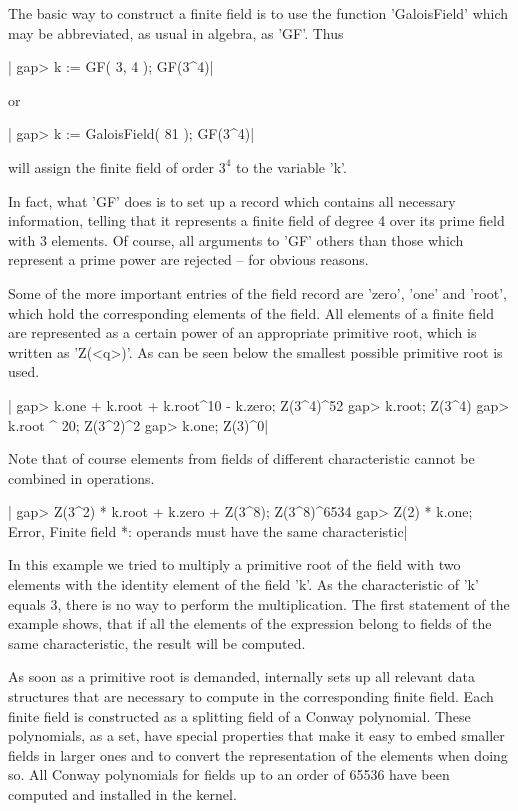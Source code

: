 The basic  way  to  construct  a finite  field  is to  use  the  function
'GaloisField'  which may  be abbreviated, as  usual in algebra,  as 'GF'.
Thus

|    gap> k := GF( 3, 4 );
    GF(3^4)|

or

|    gap> k := GaloisField( 81 );
    GF(3^4)|

will assign the finite field of order $3^4$ to the variable 'k'.

In  fact, what  'GF'  does  is to  set  up a  record  which contains  all
necessary  information,  telling that  it represents  a  finite  field of
degree 4 over its prime field with  3 elements.  Of course, all arguments
to 'GF' others than those which represent a  prime power are rejected  --
for obvious reasons.

Some of the  more important entries of the field record are 'zero', 'one'
and 'root',  which hold the corresponding elements  of  the  field.   All
elements  of  a finite  field  are represented as a certain power  of  an
appropriate primitive root, which is written as 'Z(<q>)'.  As can be seen
below the smallest possible primitive root is used.

|    gap> k.one + k.root + k.root^10 - k.zero;
    Z(3^4)^52
    gap> k.root;
    Z(3^4)
    gap> k.root ^ 20;
    Z(3^2)^2
    gap> k.one;
    Z(3)^0|

Note that  of  course  elements from  fields of  different characteristic
cannot be combined in operations.

|    gap> Z(3^2) * k.root + k.zero + Z(3^8);
    Z(3^8)^6534
    gap> Z(2) * k.one;
    Error, Finite field *: operands must have the same characteristic|

In this example we tried to multiply a primitive  root of the  field with
two  elements  with  the  identity  element  of  the field  'k'.  As  the
characteristic  of  'k'  equals  3,  there  is  no  way  to  perform  the
multiplication.  The  first statement of the example shows,  that  if all
the   elements  of  the  expression   belong   to   fields  of  the  same
characteristic, the result will be computed.

As soon as  a primitive  root is demanded,  {\GAP} internally sets up all
relevant  data  structures   that  are  necessary  to   compute   in  the
corresponding  finite  field.  Each  finite field  is  constructed  as  a
splitting field  of a  Conway polynomial.   These polynomials, as a  set,
have  special  properties  that  make it easy to  embed smaller fields in
larger ones and to convert the representation of the  elements when doing
so.  All Conway polynomials for fields  up to an order of 65536 have been
computed and installed in the {\GAP} kernel.

